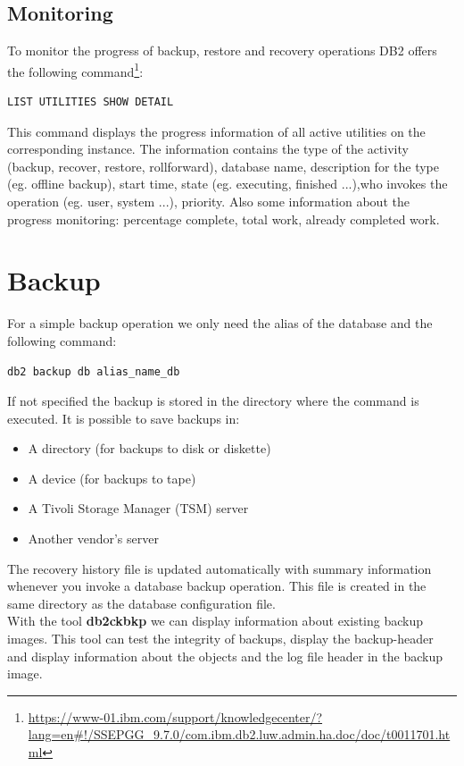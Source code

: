 \documentclass{vldb}
\begin{document}
\subsection{Monitoring}
To monitor the progress of backup, restore and recovery operations DB2 offers the following command\footnote{\url{https://www-01.ibm.com/support/knowledgecenter/?lang=en#!/SSEPGG_9.7.0/com.ibm.db2.luw.admin.ha.doc/doc/t0011701.html}}:
\begin{verbatim}
LIST UTILITIES SHOW DETAIL
\end{verbatim}

This command displays the progress information of all active utilities on the corresponding instance. The information contains the type of the activity (backup, recover, restore, rollforward), database name, description for the type (eg. offline backup), start time, state (eg. executing, finished ...),who invokes the operation (eg. user, system ...), priority. Also some information about the progress monitoring: percentage complete, total work, already completed work.    

\section{Backup}
For a simple backup operation we only need the alias of the database and the following command:
\begin{verbatim}
db2 backup db alias_name_db
\end{verbatim}

If not specified the backup is stored in the directory where the command is executed. It is possible to save backups in:
\begin{itemize}
\item A directory (for backups to disk or diskette)
\item A device (for backups to tape)
\item A Tivoli Storage Manager (TSM) server
\item Another vendor's server
\end{itemize}

The recovery history file is updated automatically with summary information whenever you invoke a database backup operation. This file is created in the same directory as the database configuration file.\\

With the tool \textbf{db2ckbkp} we can display information about existing backup images. This tool can test the integrity of backups, display the backup-header and display information about the objects and the log file header in the backup image.
\end{document}
